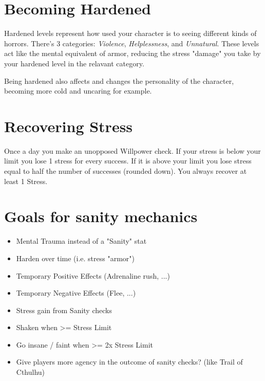 
\section{Becoming Hardened}
Hardened levels represent how used your character is to seeing different kinds of horrors.
There's 3 categories: \textit{Violence}, \textit{Helplessness}, and \textit{Unnatural}.
These levels act like the mental equivalent of armor, reducing the stress "damage" 
you take by your hardened level in the relavant category.

Being hardened also affects and changes the personality of the character, becoming more cold and uncaring for example.


\section{Recovering Stress}
Once a day you make an unopposed Willpower check. 
If your stress is below your limit you lose 1 stress for every success. 
If it is above your limit you lose stress equal to half the number of successes (rounded down).
You always recover at least 1 Stress.

\section{Goals for sanity mechanics}
\begin{itemize}
    \item Mental Trauma instead of a "Sanity" stat
    \item Harden over time (i.e. stress "armor")
    \item Temporary Positive Effects (Adrenaline rush, ...)
    \item Temporary Negative Effects (Flee, ...)
    \item Stress gain from Sanity checks
    \item Shaken when >= Stress Limit
    \item Go insane / faint when >= 2x Stress Limit
    \item Give players more agency in the outcome of sanity checks? (like Trail of Cthulhu)
\end{itemize}


